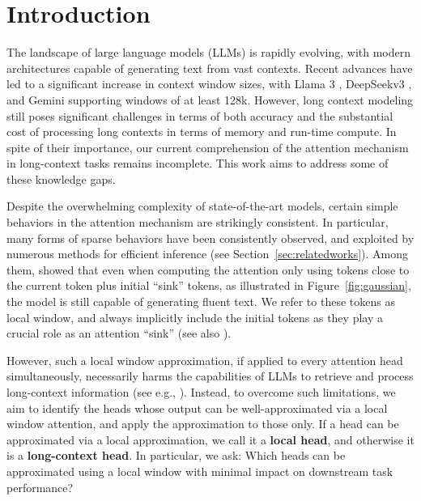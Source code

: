 



\section{Introduction}
\label{section:intro}



The landscape of large language models (LLMs) is rapidly evolving, with modern architectures capable of generating text from vast contexts. Recent advances have led to a significant increase in context window sizes, with Llama 3 \citep{dubey2024llama}, DeepSeekv3 \citep{liu2024deepseek}, and Gemini \citep{team2024gemini} supporting windows of at least 128k. 
However, long context modeling still poses significant challenges \citep{hsieh2024ruler} in terms of both accuracy  and  the substantial cost of processing long contexts in terms of memory and run-time compute. 
In spite of their importance, our current comprehension of the attention mechanism in long-context tasks remains incomplete. This work aims to address some of these knowledge gaps.

Despite the overwhelming complexity of state-of-the-art models, certain simple behaviors in the attention mechanism are strikingly consistent. In particular, many forms of sparse behaviors have been consistently observed, and exploited by numerous methods for efficient inference (see Section~\ref{sec:relatedworks}). 
Among them, \citet{xiao2023efficient} showed that even when computing the attention only using tokens close to the current token plus initial ``sink'' tokens, as illustrated in Figure~\ref{fig:gaussian},  the model is still capable of generating fluent text. We refer to these tokens as local window, and always implicitly include the   initial tokens as they play a crucial role as an attention ``sink'' (see also \citet{chen2024magicpig,gu2024attention,sun2024massive}). 

However, such a local window approximation, if applied to every attention head simultaneously, necessarily harms the capabilities of LLMs to retrieve and process long-context information (see e.g., \citet{xiao2024duoattention}).
Instead, to overcome such limitations, we aim to identify the heads whose output can be well-approximated via a local window attention, and apply the approximation to those only. If a head can be approximated via a local approximation, we call it a \textbf{local head}, and otherwise it is a \textbf{long-context head}. 
In particular, we ask:     Which heads can be approximated using a local window with minimal impact on downstream task performance?

